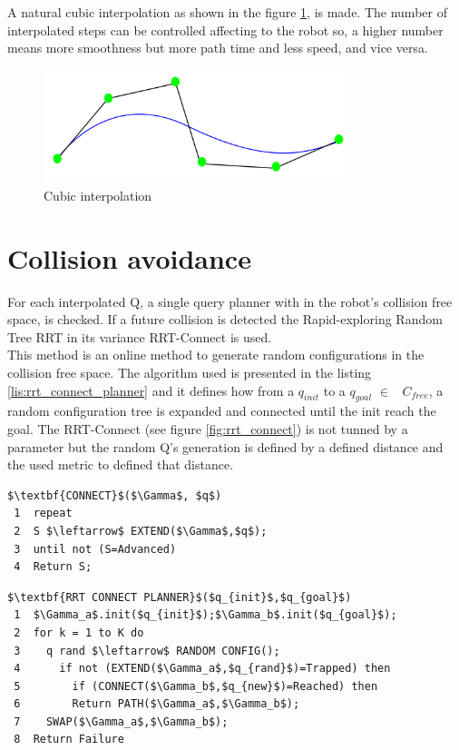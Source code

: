A natural cubic interpolation as shown in the figure \ref{fig:cubic interpolation}, is made. The number of interpolated steps can be controlled affecting to the robot so, a higher number means more smoothness but more path time and less speed, and vice versa.

\begin{figure}[!hb]
	\centering
	\includegraphics[width=0.8\textwidth]{figures/cubic_interpolation}
	\caption{Cubic interpolation}
	\label{fig:cubic interpolation}
\end{figure}

\section{Collision avoidance} %
\label{sec:collision_avoidance}
For each interpolated Q, a single query planner with in the robot's collision free space, is checked. If a future collision is detected the Rapid-exploring Random Tree RRT in its variance RRT-Connect \cite{RRTConnect} is used.\\

This method is an online method to generate random configurations in the collision free space.
The algorithm used is presented in the listing \ref{lis:rrt_connect_planner} and it defines how from a $q_{init}$ to a $q_{goal}$ $\in$ \ $C_{free}$, a random configuration tree is expanded and connected  until the init reach the goal. The RRT-Connect (see figure \ref{fig:rrt_connect}) is not tunned by a parameter but the random Q's generation is defined by a defined distance and the used metric to defined that distance.

\begin{lstlisting}[frame=tb, mathescape=true, xleftmargin=.28\textwidth, xrightmargin=.28\textwidth,caption=RRT-Connect Algorithm, label=lis:rrt_connect_planner]
$\textbf{CONNECT}$($\Gamma$, $q$)
 1  repeat 
 2  S $\leftarrow$ EXTEND($\Gamma$,$q$);
 3  until not (S=Advanced)
 4  Return S;
\end{lstlisting}
\lstset{}

\begin{lstlisting}[frame=tb, mathescape=true,xleftmargin=.13\textwidth, xrightmargin=.13\textwidth]
$\textbf{RRT CONNECT PLANNER}$($q_{init}$,$q_{goal}$)
 1  $\Gamma_a$.init($q_{init}$);$\Gamma_b$.init($q_{goal}$);
 2  for k = 1 to K do
 3    q rand $\leftarrow$ RANDOM CONFIG();
 4      if not (EXTEND($\Gamma_a$,$q_{rand}$)=Trapped) then
 5        if (CONNECT($\Gamma_b$,$q_{new}$)=Reached) then
 6        Return PATH($\Gamma_a$,$\Gamma_b$);
 7    SWAP($\Gamma_a$,$\Gamma_b$);
 8  Return Failure
\end{lstlisting}

